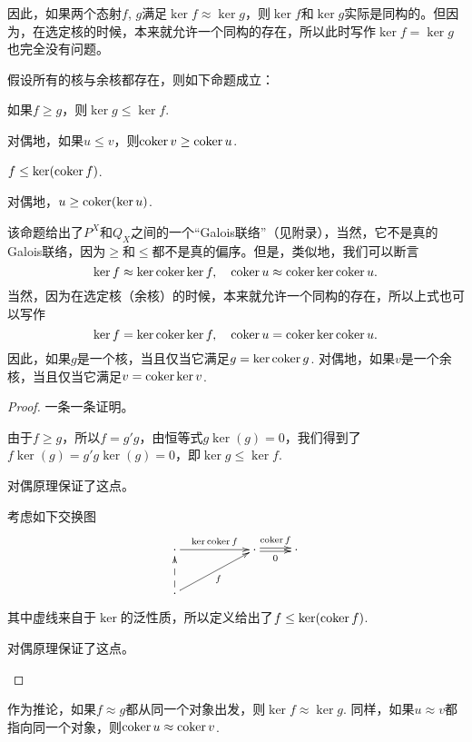 因此，如果两个态射$f$, $g$满足$\ker f\approx \ker g$，则$\ker f$和$\ker g$实际是同构的。但因为，在选定核的时候，本来就允许一个同构的存在，所以此时写作$\ker f=\ker g$也完全没有问题。

\begin{pro}\label{glgl}假设所有的核与余核都存在，则如下命题成立：
\begin{compactenum}[~~~(1)]
\item 如果$f\geq g$，则$\ker g \leq \ker f$. 
\item 对偶地，如果$u\leq v$，则$\operatorname{coker} v \geq \operatorname{coker} u$. 
\item $f\leq \ker(\operatorname{coker} f)$.
\item 对偶地，$u\geq \operatorname{coker}(\ker u)$.
\end{compactenum}
\end{pro}

该命题给出了$P^X$和$Q_X$之间的一个“Galois联络”（见附录），当然，它不是真的Galois联络，因为$\geq$和$\leq$都不是真的偏序。但是，类似地，我们可以断言
\[
	\ker f\approx \ker \operatorname{coker} \ker f,\quad \operatorname{coker} u \approx \operatorname{coker} \ker \operatorname{coker} u.
\]
当然，因为在选定核（余核）的时候，本来就允许一个同构的存在，所以上式也可以写作
\begin{equation}\label{kck}
\ker f= \ker \operatorname{coker} \ker f,\quad \operatorname{coker} u = \operatorname{coker} \ker \operatorname{coker} u.
\end{equation}
因此，如果$g$是一个核，当且仅当它满足$g=\ker \operatorname{coker} g$. 对偶地，如果$v$是一个余核，当且仅当它满足$v = \operatorname{coker} \ker v$.

\begin{proof}一条一条证明。
\begin{compactenum}[~~~(1)]
\item 由于$f\geq g$，所以$f=g'g$，由恒等式$g\ker(g)=0$，我们得到了$f\ker(g)=g'g\ker(g)=0$，即$\ker g\leq \ker f$. 
\item 对偶原理保证了这点。
\item 考虑如下交换图
\[
\begin{xy}
	\xymatrix{
	\cdot \ar[rr]^-{\ker \coker f}&&\cdot \ar@<0.3ex>[r]^-{\coker f} \ar@<-0.3ex>[r]_-{0}&\cdot \\
	\cdot \ar@{-->}[u]\ar[urr]_f
	}
\end{xy}
\]
其中虚线来自于$\ker$的泛性质，所以定义给出了$f\leq \ker(\operatorname{coker} f)$.
\item 对偶原理保证了这点。\qedhere
\end{compactenum}
\end{proof}

作为推论，如果$f\approx g$都从同一个对象出发，则$\ker f\approx \ker g$. 同样，如果$u\approx v$都指向同一个对象，则$\operatorname{coker} u \approx \operatorname{coker} v$.

